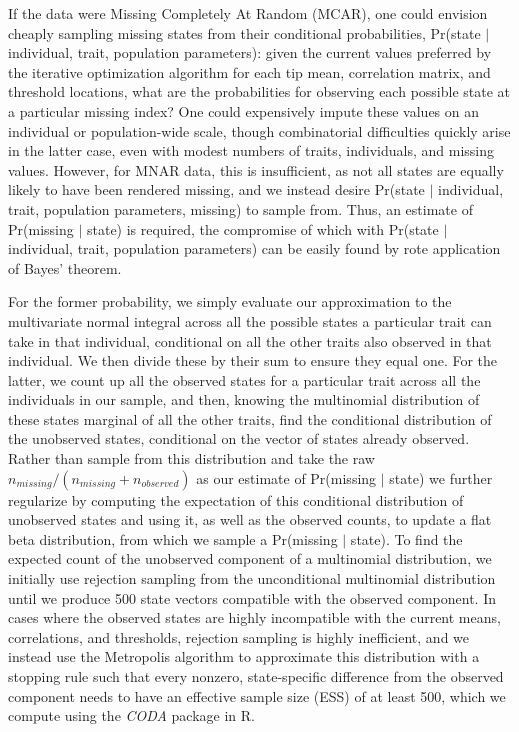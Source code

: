If the data were Missing Completely At Random (MCAR), one could envision cheaply sampling missing states from their conditional probabilities, Pr(state $\vert$ individual, trait, population parameters): given the current values preferred by the iterative optimization algorithm for each tip mean, correlation matrix, and threshold locations, what are the probabilities for observing each possible state at a particular missing index? One could expensively impute these values on an individual or population-wide scale, though combinatorial difficulties quickly arise in the latter case, even with modest numbers of traits, individuals, and missing values. However, for MNAR data, this is insufficient, as not all states are equally likely to have been rendered missing, and we instead desire Pr(state $\vert$ individual, trait, population parameters, missing) to sample from. Thus, an estimate of Pr(missing $\vert$ state) is required, the compromise of which with Pr(state $\vert$ individual, trait, population parameters) can be easily found by rote application of Bayes' theorem.

For the former probability, we simply evaluate our approximation to the multivariate normal integral across all the possible states a particular trait can take in that individual, conditional on all the other traits also observed in that individual. We then divide these by their sum to ensure they equal one. For the latter, we count up all the observed states for a particular trait across all the individuals in our sample, and then, knowing the multinomial distribution of these states marginal of all the other traits, find the conditional distribution of the unobserved states, conditional on the vector of states already observed. Rather than sample from this distribution and take the raw $n_{missing} / (n_{missing} + n_{observed})$ as our estimate of Pr(missing $\vert$ state) we further regularize by computing the expectation of this conditional distribution of unobserved states and using it, as well as the observed counts, to update a flat beta distribution, from which we sample a Pr(missing $\vert$ state). To find the expected count of the unobserved component of a multinomial distribution, we initially use rejection sampling from the unconditional multinomial distribution until we produce 500 state vectors compatible with the observed component. In cases where the observed states are highly incompatible with the current means, correlations, and thresholds, rejection sampling is highly inefficient, and we instead use the Metropolis algorithm to approximate this distribution with a stopping rule such that every nonzero, state-specific difference from the observed component needs to have an effective sample size (ESS) of at least 500, which we compute using the \textit{CODA} package \citep{plummerCODAConvergenceDiagnosis2006} in R.

